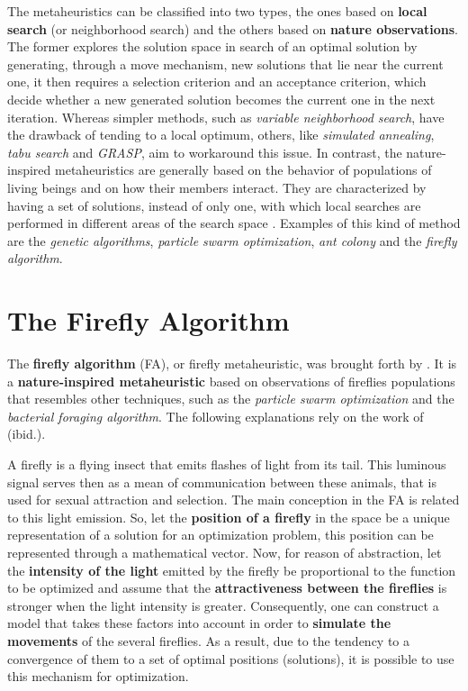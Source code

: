 \documentclass[tuberlin,cic,tc,openright,english,noabntcite,oneside]{iiufrgs}
\begin{document}
The metaheuristics can be classified into two types, the ones based on \textbf{local search} (or neighborhood search) and the others based on \textbf{nature observations}. The former explores the solution space in search of an optimal solution by generating, through a move mechanism, new solutions that lie near the current one, it then requires a selection criterion and an acceptance criterion, which decide whether a new generated solution becomes the current one in the next iteration. Whereas simpler methods, such as \emph{variable neighborhood search}, have the drawback of tending to a local optimum, others, like \emph{simulated annealing}, \emph{tabu search} and \emph{GRASP}, aim to workaround this issue. In contrast, the nature-inspired metaheuristics are generally based on the behavior of populations of living beings and on how their members interact. They are characterized by having a set of solutions, instead of only one, with which local searches are performed in different areas of the search space \parencite[p. 7]{osman_meta-heuristics:_2012}. Examples of this kind of method are the \emph{genetic algorithms}, \emph{particle swarm optimization}, \emph{ant colony} and the \emph{firefly algorithm}.

\section{The Firefly Algorithm}
The \textbf{firefly algorithm} (FA), or firefly metaheuristic, was brought forth by \textcite{yang_firefly_2009}. It is a \textbf{nature-inspired metaheuristic} based on observations of fireflies populations that resembles other techniques, such as the \emph{particle swarm optimization} and the \emph{bacterial foraging algorithm}. The following explanations rely on the work of (ibid.).

A firefly is a flying insect that emits flashes of light from its tail. This luminous signal serves then as a mean of communication between these animals, that is used for sexual attraction and selection. The main conception in the FA is related to this light emission. So, let the \textbf{position of a firefly} in the space be a unique representation of a solution for an optimization problem, this position can be represented through a mathematical vector. Now, for reason of abstraction, let the \textbf{intensity of the light} emitted by the firefly be proportional to the function to be optimized and assume that the \textbf{attractiveness between the fireflies} is stronger when the light intensity is greater. Consequently, one can construct a model that takes these factors into account in order to \textbf{simulate the movements} of the several fireflies. As a result, due to the tendency to a convergence of them to a set of optimal positions (solutions), it is possible to use this mechanism for optimization.
\end{document}
